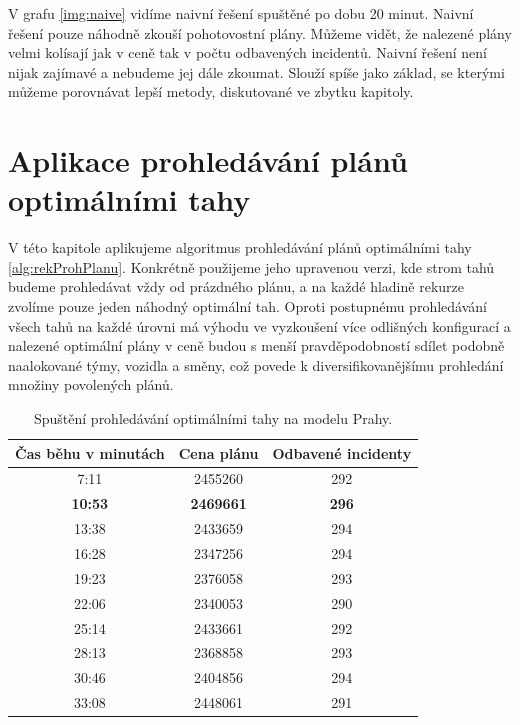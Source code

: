 V grafu \ref{img:naive} vidíme naivní řešení spuštěné po dobu 20 minut.
Naivní řešení pouze náhodně zkouší pohotovostní plány. Můžeme vidět, že nalezené plány velmi kolísají jak v ceně tak v počtu odbavených incidentů. 
Naivní řešení není nijak zajímavé a nebudeme jej dále zkoumat. Slouží spíše jako základ, se kterými můžeme porovnávat lepší metody, diskutované ve zbytku kapitoly.

\section{Aplikace prohledávání plánů optimálními \linebreak tahy}

V této kapitole aplikujeme algoritmus prohledávání plánů optimálními tahy \ref{alg:rekProhPlanu}.
Konkrétně použijeme jeho upravenou verzi, kde strom tahů budeme prohledávat vždy od prázdného plánu, a na každé hladině rekurze zvolíme pouze jeden náhodný optimální tah.
Oproti postupnému prohledávání všech tahů na každé úrovni má výhodu ve vyzkoušení více odlišných konfigurací a nalezené optimální plány v ceně budou s menší pravděpodobností sdílet
podobně naalokované týmy, vozidla a směny, což povede k diversifikovanějšímu prohledání množiny povolených plánů.

\begin{table}[h!]
\centering
\begin{tabular}{|c|c|c|}
\hline
\textbf{Čas běhu v minutách} & \textbf{Cena plánu} & \textbf{Odbavené incidenty} \\
\hline
7:11 & 2455260 & 292 \\
\hline
  \textbf{10:53} & \textbf{2469661} & \textbf{296} \\
\hline
13:38 & 2433659 & 294 \\
\hline
16:28 & 2347256 & 294 \\
\hline
19:23 & 2376058 & 293 \\
\hline
22:06 & 2340053 & 290 \\
\hline
25:14 & 2433661 & 292 \\
\hline
28:13 & 2368858 & 293 \\
\hline
30:46 & 2404856 & 294 \\
\hline
33:08 & 2448061 & 291 \\
\hline
\end{tabular}
\caption{Spuštění prohledávání optimálními tahy na modelu Prahy.}
\label{table:optimalMovesTabulka}
\end{table}

